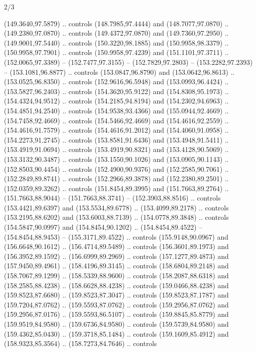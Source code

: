 \begin{flagdescription}{2/3}
\begin{scope}[xshift=0.5\flaglength,yshift=0.5\flagwidth,scale=\flagwidth/180]
\begin{scope}[y=0.8pt, x=0.8pt, yscale=-1,shift={(-168.75,-108.75)}]
  (149.3640,97.5879) .. controls (148.7985,97.4444) and (148.7077,97.0870) ..
  (149.2380,97.0870) .. controls (149.4372,97.0870) and (149.7360,97.2950) ..
  (149.9001,97.5440) .. controls (150.3220,98.1885) and (150.9958,98.3379) ..
  (150.9958,97.7901) .. controls (150.9958,97.4239) and (151.1101,97.3711) ..
  (152.0065,97.3389) -- (152.7477,97.3155) -- (152.7829,97.2803) --
  (153.2282,97.2393) -- (153.1081,96.8877) .. controls (153.0847,96.8790) and
  (153.0642,96.8613) .. (153.0525,96.8350) .. controls (152.9616,96.5948) and
  (153.0993,96.4424) .. (153.5827,96.2403) .. controls (154.3620,95.9122) and
  (154.8308,95.1973) .. (154.4324,94.9512) .. controls (154.2185,94.8194) and
  (154.2302,94.6963) .. (154.4851,94.2540) .. controls (154.9538,93.4366) and
  (155.0944,92.4669) .. (154.7458,92.4669) .. controls (154.5466,92.4669) and
  (154.4616,92.2559) .. (154.4616,91.7579) .. controls (154.4616,91.2012) and
  (154.4060,91.0958) .. (154.2273,91.2745) .. controls (153.8581,91.6436) and
  (153.4948,91.5411) .. (153.4919,91.0694) .. controls (153.4919,90.8321) and
  (153.4128,90.5069) .. (153.3132,90.3487) .. controls (153.1550,90.1026) and
  (153.0905,90.1143) .. (152.8503,90.4454) .. controls (152.4900,90.9376) and
  (152.2585,90.7061) .. (152.2849,89.8741) .. controls (152.2966,89.3878) and
  (152.2380,89.2501) .. (152.0359,89.3262) .. controls (151.8454,89.3995) and
  (151.7663,89.2764) .. (151.7663,88.9044) -- (151.7663,88.3741) --
  (152.3903,88.8516) .. controls (153.4421,89.6397) and (153.5534,89.6778) ..
  (153.4099,89.2178) .. controls (153.2195,88.6202) and (153.6003,88.7139) ..
  (154.0778,89.3848) .. controls (154.5847,90.0997) and (154.8454,90.1202) ..
  (154.8454,89.4522) -- (154.8454,88.9453) -- (155.3171,89.4522) .. controls
  (155.9148,90.0967) and (156.6648,90.1612) .. (156.4714,89.5489) .. controls
  (156.3601,89.1973) and (156.3952,89.1592) .. (156.6999,89.2969) .. controls
  (157.1277,89.4873) and (157.9450,89.4961) .. (158.4196,89.3145) .. controls
  (158.6804,89.2148) and (158.7067,89.1299) .. (158.5339,88.9600) .. controls
  (158.2087,88.6318) and (158.2585,88.4238) .. (158.6628,88.4238) .. controls
  (159.0466,88.4238) and (159.8523,87.6680) .. (159.8523,87.3047) .. controls
  (159.8523,87.1787) and (159.7204,87.0762) .. (159.5593,87.0762) .. controls
  (159.2956,87.0762) and (159.2956,87.0176) .. (159.5593,86.5107) .. controls
  (159.8845,85.8779) and (159.9519,84.9580) .. (159.6736,84.9580) .. controls
  (159.5739,84.9580) and (159.4362,85.0430) .. (159.3718,85.1484) .. controls
  (159.1609,85.4912) and (158.9323,85.3564) .. (158.7273,84.7646) .. controls

\end{scope}
\end{scope}
\end{flagdescription}
